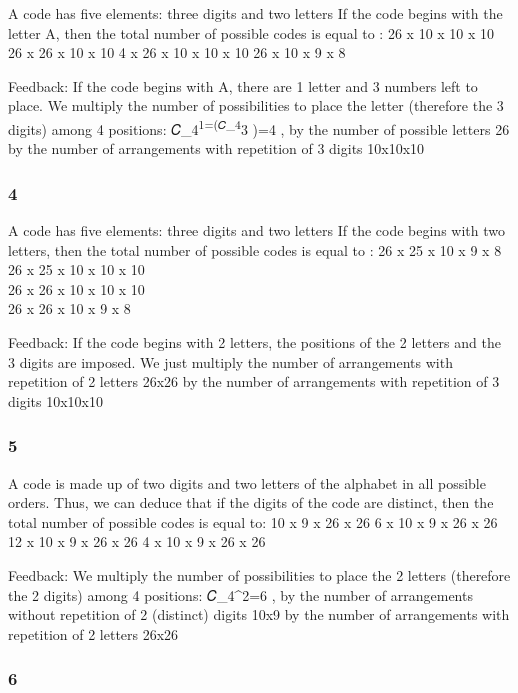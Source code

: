 \documentclass[
  letterpaper,
  DIV=11,
  numbers=noendperiod]{scrreprt}
\begin{document}
A code has five elements: three digits and two letters If the code
begins with the letter A, then the total number of possible codes is
equal to : 26 x 10 x 10 x 10 26 x 26 x 10 x 10 4 x 26 x 10 x 10 x 10 26
x 10 x 9 x 8

Feedback: If the code begins with A, there are 1 letter and 3 numbers
left to place. We multiply the number of possibilities to place the
letter (therefore the 3 digits) among 4 positions:
𝐶\_4\textsuperscript{1=(𝐶\_4}3 )=4 , by the number of possible letters
26 by the number of arrangements with repetition of 3 digits 10x10x10

\subsubsection{4}\label{section-3}

A code has five elements: three digits and two letters If the code
begins with two letters, then the total number of possible codes is
equal to : 26 x 25 x 10 x 9 x 8 26 x 25 x 10 x 10 x 10\\
26 x 26 x 10 x 10 x 10\\
26 x 26 x 10 x 9 x 8

Feedback: If the code begins with 2 letters, the positions of the 2
letters and the 3 digits are imposed. We just multiply the number of
arrangements with repetition of 2 letters 26x26 by the number of
arrangements with repetition of 3 digits 10x10x10

\subsubsection{5}\label{section-4}

A code is made up of two digits and two letters of the alphabet in all
possible orders. Thus, we can deduce that if the digits of the code are
distinct, then the total number of possible codes is equal to: 10 x 9 x
26 x 26 6 x 10 x 9 x 26 x 26 12 x 10 x 9 x 26 x 26 4 x 10 x 9 x 26 x 26

Feedback: We multiply the number of possibilities to place the 2 letters
(therefore the 2 digits) among 4 positions: 𝐶\_4\^{}2=6 , by the number
of arrangements without repetition of 2 (distinct) digits 10x9 by the
number of arrangements with repetition of 2 letters 26x26

\subsubsection{6}\label{section-5}
\end{document}
